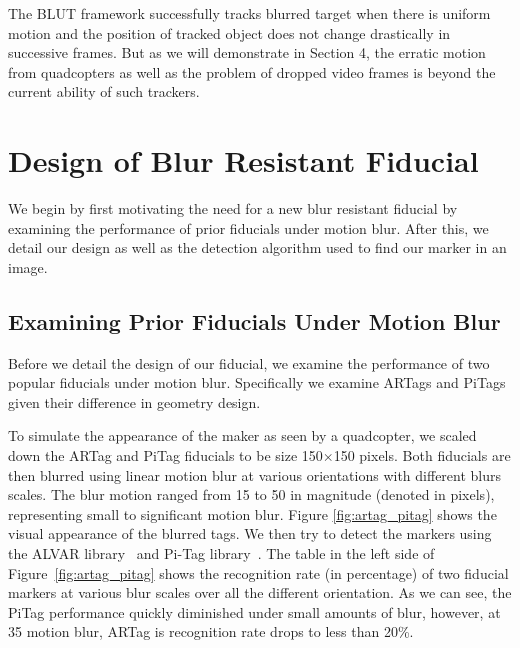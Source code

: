 \documentclass[runningheads]{llncs}
\begin{document}
The BLUT framework successfully tracks blurred target when there is uniform motion
and the position of tracked object does not change drastically in successive
frames. But as we will demonstrate in Section 4, the erratic motion from quadcopters as
well as the problem of dropped video frames is beyond the current ability of such trackers.

\section{Design of Blur Resistant Fiducial}

We begin by first motivating the need for a new blur resistant fiducial by examining
the performance of prior fiducials under motion blur.  After this, we detail
our design as well as the detection algorithm used to find our marker in an image.

\subsection{Examining Prior Fiducials Under Motion Blur}\label{sec:blurtest}

Before we detail the design of our fiducial, we examine the performance of two
popular fiducials under motion blur.  Specifically we examine ARTags
\cite{Fiala05} and PiTags\cite{Pitag13} given their difference in geometry design.

To simulate the appearance of the maker as seen by a quadcopter,  we scaled down
the ARTag and PiTag fiducials to be size 150$\times$150 pixels. Both fiducials are then blurred
using linear motion blur at various orientations with different blurs scales.  
The blur motion ranged from 15 to 50 in magnitude (denoted in pixels),
representing small to significant motion blur. Figure \ref{fig:artag_pitag}
shows the visual appearance of the blurred tags.  We then try to detect the
markers using the ALVAR library~\cite{alvar} and Pi-Tag
library~\cite{ros_pitag}. The table in the left side of
Figure~\ref{fig:artag_pitag} shows the recognition rate (in percentage) of two
fiducial markers at various blur scales over all the different orientation.  
As we can see, the PiTag performance quickly diminished under small amounts of
blur, however, at 35 motion blur, ARTag is recognition rate drops to less than 20\%.
\end{document}
